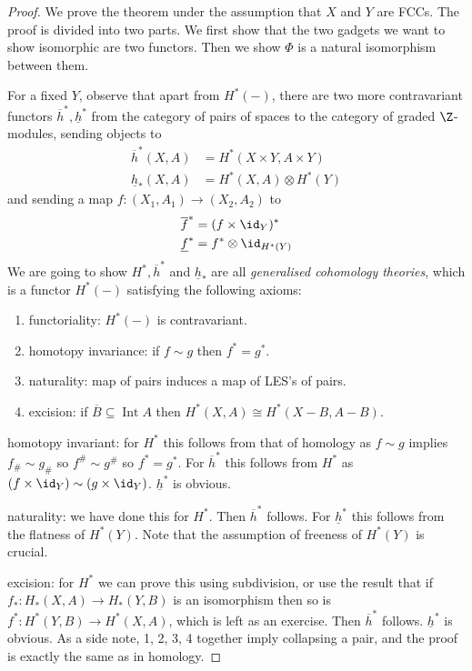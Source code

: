 \documentclass[a4paper]{article}
\DeclareMathOperator{\Int}{Int} %
\begin{document}
\begin{proof}
  We prove the theorem under the assumption that \(X\) and \(Y\) are FCCs. The proof is divided into two parts. We first show that the two gadgets we want to show isomorphic are two functors. Then we show \(\Phi\) is a natural isomorphism between them.

  For a fixed \(Y\), observe that apart from \(H^*(-)\), there are two more contravariant functors \(\overline h^*, \underline h^*\) from the category of pairs of spaces to the category of graded \(\Z\)-modules, sending objects to
  \begin{align*}
    \overline h^*(X, A) &= H^*(X \times Y, A \times Y) \\
    \underline h_*(X, A) &= H^*(X, A) \otimes H^*(Y)
  \end{align*}
  and sending a map \(f: (X_1, A_1) \to (X_2, A_2)\) to
  \begin{align*}
    \overline f^* &= (f \times \id_Y)^* \\
    \underline f^* &= f^* \otimes \id_{H^*(Y)}
  \end{align*}
  We are going to show \(H^*, \overline h^*\) and \(\underline h_*\) are all \emph{generalised cohomology theories}, which is a functor \(H^*(-)\) satisfying the following axioms:
  \begin{enumerate}
  \item functoriality: \(H^*(-)\) is contravariant.
  \item homotopy invariance: if \(f \sim g\) then \(f^* = g^*\).
  \item naturality: map of pairs induces a map of LES's of pairs.
  \item excision: if \(\overline B \subseteq \Int A\) then \(H^*(X, A) \cong H^*(X - B, A - B)\).
  \end{enumerate}

  homotopy invariant: for \(H^*\) this follows from that of homology as \(f \sim g\) implies \(f_\# \sim g_\#\) so \(f^\# \sim g^\#\) so \(f^* = g^*\). For \(\overline h^*\) this follows from \(H^*\) as \((f \times \id_Y) \sim (g \times \id_Y)\). \(\underline h^*\) is obvious.

  naturality: we have done this for \(H^*\). Then \(\overline h^*\) follows. For \(\underline h^*\) this follows from the flatness of \(H^*(Y)\). Note that the assumption of freeness of \(H^*(Y)\) is crucial.

  excision: for \(H^*\) we can prove this using subdivision, or use the result that if \(f_*: H_*(X, A) \to H_*(Y, B)\) is an isomorphism then so is \(f^*: H^*(Y, B) \to H^*(X, A)\), which is left as an exercise. Then \(\overline h^*\) follows. \(\underline h^*\) is obvious. As a side note, 1, 2, 3, 4 together imply collapsing a pair, and the proof is exactly the same as in homology.


\end{proof}
\end{document}

